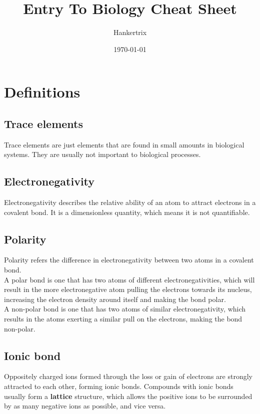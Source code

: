 \documentclass[11pt]{article}
\author{Hankertrix}
\date{\today}
\title{Entry To Biology Cheat Sheet}
\begin{document}
\maketitle
\setcounter{tocdepth}{2}
\tableofcontents

\newpage

\section{Definitions}
\label{sec:org0efff57}

\subsection{Trace elements}
\label{sec:org8ab6beb}
Trace elements are just elements that are found in small amounts in biological systems. They are usually not important to biological processes.

\subsection{Electronegativity}
\label{sec:org12039f6}
Electronegativity describes the relative ability of an atom to attract electrons in a covalent bond. It is a dimensionless quantity, which means it is not quantifiable.

\subsection{Polarity}
\label{sec:org05bd3a8}
Polarity refers the difference in electronegativity between two atoms in a covalent bond.
\\[0pt]

A polar bond is one that has two atoms of different electronegativities, which will result in the more electronegative atom pulling the electrons towards its nucleus, increasing the electron density around itself and making the bond polar.
\\[0pt]

A non-polar bond is one that has two atoms of similar electronegativity, which results in the atoms exerting a similar pull on the electrons, making the bond non-polar.

\subsection{Ionic bond}
\label{sec:orgf7dd90e}
Oppositely charged ions formed through the loss or gain of electrons are strongly attracted to each other, forming ionic bonds. Compounds with ionic bonds usually form a \textbf{lattice} structure, which allows the positive ions to be surrounded by as many negative ions as possible, and vice versa.
\end{document}
